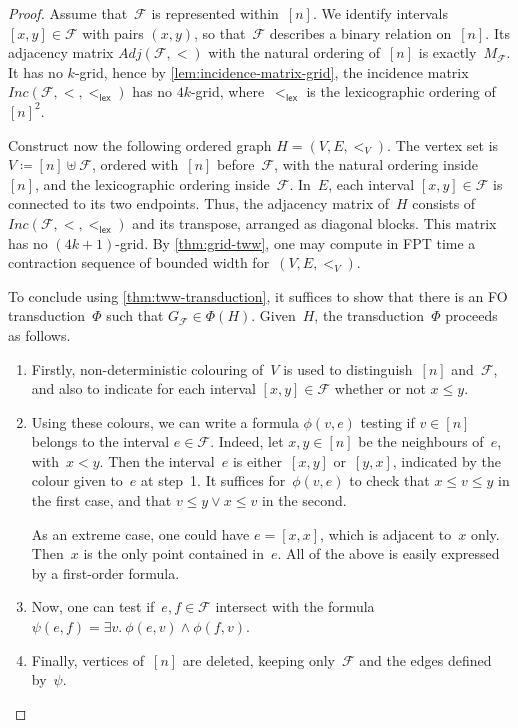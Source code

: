 \documentclass[a4paper,UKenglish,cleveref,thm-restate]{lipics-v2021}
\theoremstyle{remark}
\newcommand{\eqdef}{\coloneqq}
\newcommand{\Fc}{\mathcal{F}}
\newcommand{\lex}{\mathsf{lex}}
\newcommand{\adj}{Adj}
\newcommand{\inc}{Inc}
\begin{document}
\begin{proof}
    Assume that~$\Fc$ is represented within~$[n]$.
    We identify intervals $[x,y] \in \Fc$ with pairs $(x,y)$, so that~$\Fc$ describes a binary relation on~$[n]$.
    Its adjacency matrix $\adj(\Fc,<)$ with the natural ordering of~$[n]$ is exactly~$M_\Fc$.
    It has no $k$-grid, hence by \cref{lem:incidence-matrix-grid}, the incidence matrix $\inc(\Fc,<,<_\lex)$ has no $4k$-grid, where~$<_\lex$ is the lexicographic ordering of~$[n]^2$.

    Construct now the following ordered graph $H = (V,E,<_V)$.
    The vertex set is $V \eqdef [n] \uplus \Fc$, ordered with~$[n]$ before~$\Fc$, with the natural ordering inside~$[n]$, and the lexicographic ordering inside~$\Fc$.
    In~$E$, each interval $[x,y] \in \Fc$ is connected to its two endpoints.
    Thus, the adjacency matrix of~$H$ consists of $\inc(\Fc,<,<_\lex)$ and its transpose, arranged as diagonal blocks.
    This matrix has no $(4k+1)$-grid.
    By \cref{thm:grid-tww}, one may compute in FPT time a contraction sequence of bounded width for~$(V,E,<_V)$.

    To conclude using \cref{thm:tww-transduction}, it suffices to show that there is an FO transduction~$\Phi$ such that $G_\Fc \in \Phi(H)$. Given~$H$, the transduction~$\Phi$ proceeds as follows.
    \begin{enumerate}
        \item Firstly, non-deterministic colouring of~$V$ is used to distinguish~$[n]$ and~$\Fc$,
        and also to indicate for each interval $[x,y] \in \Fc$ whether or not $x \le y$.

        \item Using these colours, we can write a formula $\phi(v,e)$ testing if $v \in [n]$ belongs to the interval $e\in \Fc$.
        Indeed, let $x,y \in [n]$ be the neighbours of~$e$, with~$x<y$.
        Then the interval~$e$ is either~$[x,y]$ or~$[y,x]$, indicated by the colour given to~$e$ at step~1.
        It suffices for~$\phi(v,e)$ to check that $x \le v \le y$ in the first case, and that $v \le y \lor x \le v$ in the second.
        
        As an extreme case, one could have $e = [x,x]$, which is adjacent to~$x$ only.
        Then~$x$ is the only point contained in~$e$.
        All of the above is easily expressed by a first-order formula.
        
        \item Now, one can test if~$e,f \in \Fc$ intersect with the formula $\psi(e,f) = \exists v.\ \phi(e,v) \land \phi(f,v)$.

        \item Finally, vertices of~$[n]$ are deleted, keeping only~$\Fc$ and the edges defined by~$\psi$. \qedhere
    \end{enumerate}
\end{proof}
\end{document}
